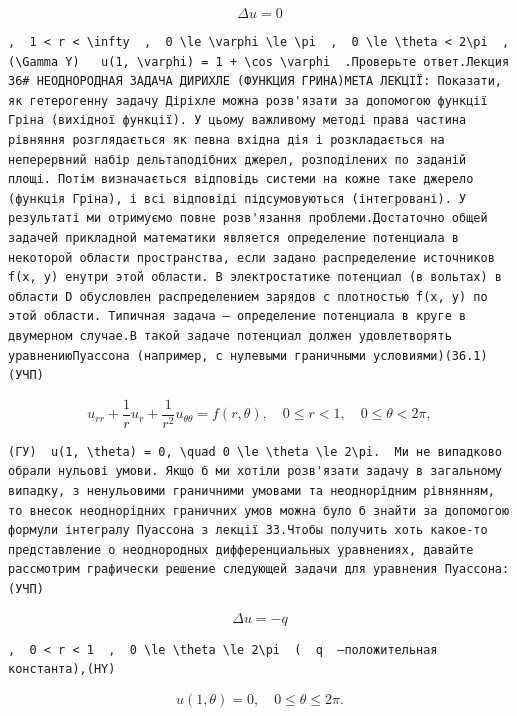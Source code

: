\documentclass[
  ukrainian,
]{article}
\begin{document}
\[
\Delta u = 0
\]

\begin{verbatim}
,  1 < r < \infty  ,  0 \le \varphi \le \pi  ,  0 \le \theta < 2\pi  ,  (\Gamma Y)   u(1, \varphi) = 1 + \cos \varphi  .Проверьте ответ.Лекция 36# НЕОДНОРОДНАЯ ЗАДАЧА ДИРИХЛЕ (ФУНКЦИЯ ГРИНА)МЕТА ЛЕКЦІЇ: Показати, як гетерогенну задачу Діріхле можна розв'язати за допомогою функції Гріна (вихідної функції). У цьому важливому методі права частина рівняння розглядається як певна вхідна дія і розкладається на неперервний набір дельтаподібних джерел, розподілених по заданій площі. Потім визначається відповідь системи на кожне таке джерело (функція Гріна), і всі відповіді підсумовуються (інтегровані). У результаті ми отримуємо повне розв'язання проблеми.Достаточно общей задачей прикладной математики является определение потенциала в некоторой области пространства, если задано распределение источников f(x, y) енутри этой области. В электростатике потенциал (в вольтах) в области D обусловлен распределением зарядов с плотностью f(x, y) по этой области. Типичная задача — определение потенциала в круге в двумерном случае.В такой задаче потенциал должен удовлетворять уравнениюПуассона (например, с нулевыми граничными условиями)(36.1) (УЧП)
\end{verbatim}

\[
u_{rr} + \frac{1}{r} u_r + \frac{1}{r^2} u_{\theta\theta} = f(r, \theta), \quad 0 \le r < 1, \quad 0 \le \theta < 2\pi,
\]

\begin{verbatim}
(ГУ)  u(1, \theta) = 0, \quad 0 \le \theta \le 2\pi.  Ми не випадково обрали нульові умови. Якщо б ми хотіли розв'язати задачу в загальному випадку, з ненульовими граничними умовами та неоднорідним рівнянням, то внесок неоднорідних граничних умов можна було б знайти за допомогою формули інтегралу Пуассона з лекції 33.Чтобы получить хоть какое-то представление о неоднородных дифференциальных уравнениях, давайте рассмотрим графически решение следующей задачи для уравнения Пуассона:(УЧП)
\end{verbatim}

\[
\Delta u = -q
\]

\begin{verbatim}
,  0 < r < 1  ,  0 \le \theta \le 2\pi  (  q  —положительная константа),(HY)
\end{verbatim}

\[
u(1, \theta) = 0, \quad 0 \le \theta \le 2\pi.
\]
\end{document}
